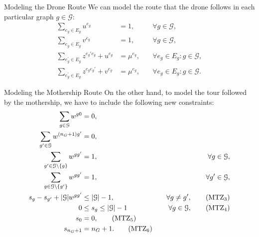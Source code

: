 \documentclass[slidestop,usepdftitle=false,10pt]{beamer}
\begin{document}
	
	\begin{frame}{Modeling the Drone Route}
	We can model the route that the drone follows in each particular graph $g\in \mathcal G$:
	\begin{align}
        \sum_{e_g\in E_g} u^{e_g} & = 1, & \quad\forall g \in \mathcal G, \label{DEnt2}\\%
        \sum_{e_g\in E_g} v^{e_g} & = 1, & \quad\forall g \in \mathcal G, \label{DExt}\\%
        \sum_{e^\prime_g\in E_g} z^{e_g'e_g} + u^{e_g} & = \mu^{e_g}, &\quad\forall e_g\in E_g:g\in\mathcal G, \label{DInu}\\
        \sum_{e^\prime_g\in E_g} z^{e_ge_g'} + v^{e_g} & = \mu^{e_g}, &\quad\forall e_g\in E_g:g\in\mathcal G. \label{DInv2}
    \end{align}
	\end{frame}
	
	\begin{frame}{Modeling the Mothership Route}
	On the other hand, to model the tour followed by the mothership, we have to include the following new constraints:
		{\color{red}
	    \begin{align}
	        \small
            \sum_{g\in\mathcal G} w^{g0} & = 0, \label{TOrig}\\
            \sum_{g'\in\mathcal G} w^{(n_G+1) g'} & = 0, \label{TDest}\\
            \sum_{g'\in\mathcal G\setminus\{g\}} w^{gg'} & = 1, \label{TExt} &\quad\forall g\in \mathcal G,\\
            \sum_{g\in\mathcal G\setminus\{g'\}} w^{gg'} & = 1, &\quad\forall g'\in \mathcal G,\label{TEnt}\\
            s_g - s_{g'} + |\mathcal G|w^{gg'} & \leq |\mathcal G| - 1  , &\quad\forall g \neq g', \tag{MTZ$_3$} \label{MTZ3}\\
            0 & \leq s_g \leq |\mathcal G| - 1 &\quad\forall g\in \mathcal G,\tag{MTZ$_4$}\label{MTZ4}\\
            s_0 & = 0, \tag{MTZ$_5$}\label{MTZ5}\\
            s_{n_G+1}&=n_G+1. \tag{MTZ$_6$}\label{MTZ6}
        \end{align}}
	\end{frame}
	
\end{document}
